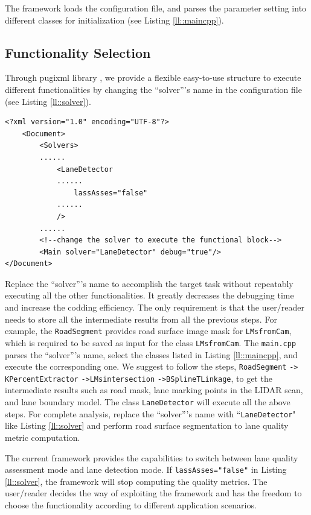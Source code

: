 \documentclass[a4paper]{article}
\begin{document}
The framework loads the configuration file, and parses the parameter setting into different classes for initialization (see Listing \ref{ll::maincpp}). 

\subsection{Functionality Selection}

Through pugixml library \cite{kapoulkine2012pugixml}, we provide a flexible easy-to-use structure to execute different functionalities by changing the ``solver'''s name in the configuration file (see Listing \ref{ll::solver}). 
\begin{lstlisting}[float, label=ll::solver, caption = Change the configuration file to select the functionality.]
<?xml version="1.0" encoding="UTF-8"?>
	<Document>
		<Solvers>
		......
			<LaneDetector 
			......
				lassAsses="false"
			......
			/>
		......
		<!--change the solver to execute the functional block-->
		<Main solver="LaneDetector" debug="true"/>
</Document>
\end{lstlisting}
Replace the ``solver'''s name to accomplish the target task without repeatably executing all the other functionalities. It greatly decreases the debugging time and increase the codding efficiency.  The only requirement is that the user/reader needs to store all the intermediate results from all the previous steps.  For example, the  \verb+RoadSegment+ provides road surface image mask for \verb+LMsfromCam+, which is required to be saved as input for the class \verb+LMsfromCam+. The \verb+main.cpp+ parses the ``solver'''s name, select the classes listed in Listing \ref{ll::maincpp}, and execute the corresponding one. We suggest to follow the steps, \verb+RoadSegment+ \verb+->+ \verb+KPercentExtractor+ \verb+->+\verb+LMsintersection+ \verb+->+\verb+BSplineTLinkage+, to get the intermediate results such as road mask, lane marking points in the LIDAR scan, and lane boundary model. The class \verb+LaneDetector+  will execute all the above steps. For complete analysis, replace the ``solver'''s name with ``\verb+LaneDetector+" like Listing \ref{ll::solver} and perform  road surface segmentation to lane quality metric computation. 

The current framework provides the capabilities to switch between lane quality assessment mode and lane detection mode. If \verb+lassAsses="false"+ in Listing \ref{ll::solver},  the framework will stop  computing the quality metrics. The user/reader decides the way of exploiting the framework and has the freedom to choose the functionality according to different application scenarios. 
\end{document}
